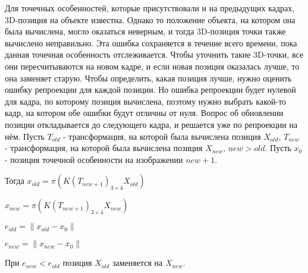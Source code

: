 Для точечных особенностей, которые присутствовали и на предыдущих кадрах,
3D-позиция на объекте известна. Однако то положение объекта, на котором она
была вычислена, могло оказаться неверным, и тогда 3D-позиция точки также
вычислено неправильно. Эта ошибка сохраняется в течение всего времени, пока
данная точечная особенность отслеживается. Чтобы уточнить такие 3D-точки, все
они пересчитываются на новом кадре, и если новая позиция оказалась лучше, то
она заменяет старую.
Чтобы определить, какая позиция лучше, нужно оценить ошибку репроекции для
каждой позиции. Но ошибка репроекции будет нулевой для кадра, по которому
позиция вычислена, поэтому нужно выбрать какой-то кадр, на котором обе ошибки
будут отличны от нуля. Вопрос об обновлении позиции откладывается до следующего
кадра, и решается уже по репроекции на нём.
Пусть $T_{old}$ - трансформация, на которой была вычислена позиция $X_{old}$,
$T_{new}$ - трансформация, на которой была вычислена позиция $X_{new}$, $new >
old$.
Пусть $x_0$ - позиция точечной особенности на изображении $new + 1$. 

Тогда $x_{old} = \pi (K (T_{new + 1})_{3 \times 4} X_{old})$

$x_{new} = \pi (K (T_{new + 1})_{3 \times 4} X_{new})$

$e_{old} = \| x_{old} - x_0 \|$

$e_{new} = \| x_{new} - x_0 \|$

При $e_{new} < e_{old}$ позиция $X_{old}$ заменяется на $X_{new}$.

